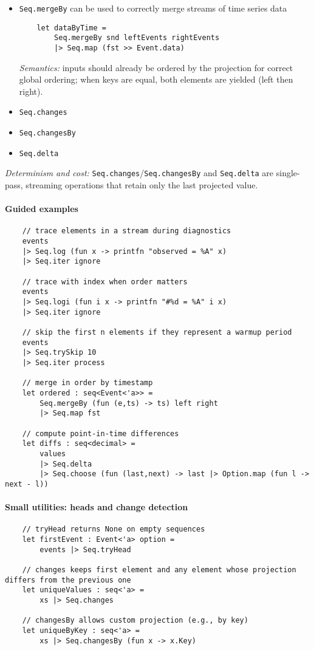 \documentclass{article}
\begin{document}
\begin{itemize}
\item \texttt{Seq.mergeBy} can be used to correctly merge streams of time series data
\begin{verbatim}
    let dataByTime =
        Seq.mergeBy snd leftEvents rightEvents
        |> Seq.map (fst >> Event.data)
\end{verbatim}
\emph{Semantics:} inputs should already be ordered by the projection for correct global ordering; when keys are equal, both elements are yielded (left then right).

\item \texttt{Seq.changes}

\item \texttt{Seq.changesBy}

\item \texttt{Seq.delta}

\end{itemize}
\emph{Determinism and cost:} \texttt{Seq.changes}/\texttt{Seq.changesBy} and \texttt{Seq.delta} are single-pass, streaming operations that retain only the last projected value.

\paragraph{Guided examples}
\begin{verbatim}
    // trace elements in a stream during diagnostics
    events
    |> Seq.log (fun x -> printfn "observed = %A" x)
    |> Seq.iter ignore

    // trace with index when order matters
    events
    |> Seq.logi (fun i x -> printfn "#%d = %A" i x)
    |> Seq.iter ignore

    // skip the first n elements if they represent a warmup period
    events
    |> Seq.trySkip 10
    |> Seq.iter process

    // merge in order by timestamp
    let ordered : seq<Event<'a>> =
        Seq.mergeBy (fun (e,ts) -> ts) left right
        |> Seq.map fst

    // compute point-in-time differences
    let diffs : seq<decimal> =
        values
        |> Seq.delta
        |> Seq.choose (fun (last,next) -> last |> Option.map (fun l -> next - l))
\end{verbatim}

\paragraph{Small utilities: heads and change detection}
\begin{verbatim}
    // tryHead returns None on empty sequences
    let firstEvent : Event<'a> option =
        events |> Seq.tryHead

    // changes keeps first element and any element whose projection differs from the previous one
    let uniqueValues : seq<'a> =
        xs |> Seq.changes

    // changesBy allows custom projection (e.g., by key)
    let uniqueByKey : seq<'a> =
        xs |> Seq.changesBy (fun x -> x.Key)
\end{verbatim}
\end{document}
